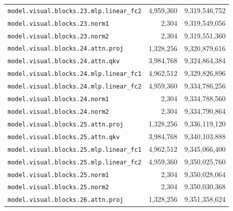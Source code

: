 \documentclass[10pt,a4paper]{article}
\theoremstyle{definition}
\begin{document}
\begin{appendices}
\begin{longtable}{p{9.5cm}rr}
\texttt{model.\allowbreak{}visual.\allowbreak{}blocks.\allowbreak{}23.\allowbreak{}mlp.\allowbreak{}linear\_fc2} & 4,959,360 & 9,319,546,752 \\
\texttt{model.\allowbreak{}visual.\allowbreak{}blocks.\allowbreak{}23.\allowbreak{}norm1} & 2,304 & 9,319,549,056 \\
\texttt{model.\allowbreak{}visual.\allowbreak{}blocks.\allowbreak{}23.\allowbreak{}norm2} & 2,304 & 9,319,551,360 \\
\texttt{model.\allowbreak{}visual.\allowbreak{}blocks.\allowbreak{}24.\allowbreak{}attn.\allowbreak{}proj} & 1,328,256 & 9,320,879,616 \\
\texttt{model.\allowbreak{}visual.\allowbreak{}blocks.\allowbreak{}24.\allowbreak{}attn.\allowbreak{}qkv} & 3,984,768 & 9,324,864,384 \\
\texttt{model.\allowbreak{}visual.\allowbreak{}blocks.\allowbreak{}24.\allowbreak{}mlp.\allowbreak{}linear\_fc1} & 4,962,512 & 9,329,826,896 \\
\texttt{model.\allowbreak{}visual.\allowbreak{}blocks.\allowbreak{}24.\allowbreak{}mlp.\allowbreak{}linear\_fc2} & 4,959,360 & 9,334,786,256 \\
\texttt{model.\allowbreak{}visual.\allowbreak{}blocks.\allowbreak{}24.\allowbreak{}norm1} & 2,304 & 9,334,788,560 \\
\texttt{model.\allowbreak{}visual.\allowbreak{}blocks.\allowbreak{}24.\allowbreak{}norm2} & 2,304 & 9,334,790,864 \\
\texttt{model.\allowbreak{}visual.\allowbreak{}blocks.\allowbreak{}25.\allowbreak{}attn.\allowbreak{}proj} & 1,328,256 & 9,336,119,120 \\
\texttt{model.\allowbreak{}visual.\allowbreak{}blocks.\allowbreak{}25.\allowbreak{}attn.\allowbreak{}qkv} & 3,984,768 & 9,340,103,888 \\
\texttt{model.\allowbreak{}visual.\allowbreak{}blocks.\allowbreak{}25.\allowbreak{}mlp.\allowbreak{}linear\_fc1} & 4,962,512 & 9,345,066,400 \\
\texttt{model.\allowbreak{}visual.\allowbreak{}blocks.\allowbreak{}25.\allowbreak{}mlp.\allowbreak{}linear\_fc2} & 4,959,360 & 9,350,025,760 \\
\texttt{model.\allowbreak{}visual.\allowbreak{}blocks.\allowbreak{}25.\allowbreak{}norm1} & 2,304 & 9,350,028,064 \\
\texttt{model.\allowbreak{}visual.\allowbreak{}blocks.\allowbreak{}25.\allowbreak{}norm2} & 2,304 & 9,350,030,368 \\
\texttt{model.\allowbreak{}visual.\allowbreak{}blocks.\allowbreak{}26.\allowbreak{}attn.\allowbreak{}proj} & 1,328,256 & 9,351,358,624 \\

\end{longtable}
\end{appendices}
\end{document}
